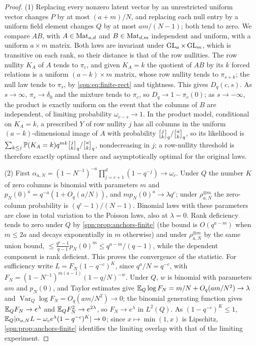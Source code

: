 \begin{proof}
(1) Replacing every nonzero latent vector by an unrestricted uniform vector changes $P$ by at most
$(a+m)/N$, and replacing each null entry by a uniform field element changes $Q$ by at most $am/(N-1)$;
both tend to zero. We compare $AB$, with $A\in\operatorname{Mat}_{a,d}$ and $B\in\operatorname{Mat}_{d,m}$ independent and
uniform, with a uniform $a\times m$ matrix. Both laws are invariant under $\operatorname{GL}_a\times\operatorname{GL}_m$, which is
transitive on each rank, so their distance is that of the row nullities. The row nullity $K_A$ of $A$
tends to $\pi_c$, and given $K_A=k$ the quotient of $AB$ by its $k$ forced relations is a uniform
$(a-k)\times m$ matrix, whose row nullity tends to $\pi_{s+k}$; the null law tends to $\pi_s$, by
\eqref{spn:eq:finite-rect} and tightness. This gives $D_q(c,s)$. As $s\to\infty$, $\pi_s\to\delta_0$ and
the mixture tends to $\pi_c$, so $D_q\to1-\pi_c(0)$; as $s\to-\infty$, the product is exactly uniform on
the event that the columns of $B$ are independent, of limiting probability $\omega_{c-s}\to1$. In the
product model, conditional on $K_A=k$, a prescribed $Y$ of row nullity $j$ has all columns in the uniform
$(a-k)$-dimensional image of $A$ with probability $\spnqbin jk{q}/\spnqbin ak{q}$, so its likelihood is
$\sum_{k\le j}\spnP(K_A=k)q^{mk}\spnqbin jk{q}/\spnqbin ak{q}$, nondecreasing in $j$; a row-nullity threshold
is therefore exactly optimal there and asymptotically optimal for the original laws.

(2) First $\alpha_{a,N}=(1-N^{-1})^{-a}\prod_{j=c+1}^d(1-q^{-j})\to\omega_c$. Under $Q$ the number $K$ of
zero columns is binomial with parameters $m$ and $p_N(0)^a=q^{-a}(1+O_q(a/N))$, and $mp_N(0)^a\to\lambda q^c$;
under $\rho_{a,N}^{\otimes m}$ the zero-column probability is $(q^c-1)/(N-1)$. Binomial laws with these
parameters are close in total variation to the Poisson laws, also at $\lambda=0$. Rank deficiency tends to
zero under $Q$ by \cref{spn:prop:anchors-finite} (the bound is $O(q^{a-m})$ when $m\le2a$ and decays
exponentially in $m$ otherwise) and under $\rho_{a,N}^{\otimes m}$ by the same union bound,
$\le\frac{q^a-1}{q-1}p_N(0)^m\le q^{a-m}/(q-1)$, while the dependent component is rank deficient. This
proves the convergence of the statistic. For sufficiency write $L=F_N(1-q^{-c})^K$, since $q^a/N=q^{-c}$, with
$F_N=(1-N^{-1})^{m(a-1)}(1-q/N)^{-w}$. Under $Q$, $w$ is binomial with parameters $am$ and $p_N(0)$, and
Taylor estimates give $\mathbb{E}_Q\log F_N=m/N+O_q(am/N^2)\to\lambda$ and $\operatorname{Var}_Q\log F_N=O_q(am/N^2)\to0$;
the binomial generating function gives $\mathbb{E}_QF_N\to e^\lambda$ and $\mathbb{E}_QF_N^2\to e^{2\lambda}$, so
$F_N\to e^\lambda$ in $L^2(Q)$. As $(1-q^{-c})^K\le1$,
$\mathbb{E}_Q\lvert\alpha_{a,N}L-\omega_ce^\lambda(1-q^{-c})^K\rvert\to0$; since $x\mapsto\min(1,x)$ is Lipschitz,
\cref{spn:prop:anchors-finite} identifies the limiting overlap with that of the limiting experiment.


\end{proof}
